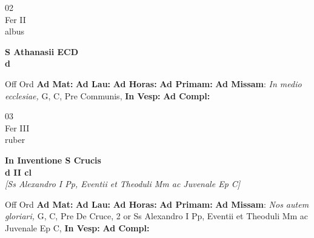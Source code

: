 \documentclass[10pt, openany]{book}
\begin{document}
    \begin{center}
        \begin{minipage}{3.5in}
            \vspace{2em}
            \begin{minipage}{0.5in}
                {\Huge 02} \\
                {\normalsize Fer II} \\
                {\normalsize albus}
            \end{minipage}
            \begin{minipage}{3.0in}
                \textbf{ \large S Athanasii ECD \\
                \textnormal{\normalsize d}} \\ 
            \end{minipage}
            \begin{justify}Off Ord
                \textbf{Ad Mat: }
                \textbf{Ad Lau: }
                \textbf{Ad Horas: }
                \textbf{Ad Primam: }\textbf{Ad Missam}: \textit{In medio ecclesiae,} G, C, Pre Communis,  
                \textbf{In Vesp: }
                \textbf{Ad Compl: }
            \end{justify}
        \end{minipage}
    \end{center}

    \begin{center}
        \begin{minipage}{3.5in}
            \vspace{2em}
            \begin{minipage}{0.5in}
                {\Huge 03} \\
                {\normalsize Fer III} \\
                {\normalsize ruber}
            \end{minipage}
            \begin{minipage}{3.0in}
                \textbf{ \large In Inventione S Crucis \\
                \textnormal{\normalsize d II cl}} \\ \textit{[Ss Alexandro I Pp, Eventii et Theoduli Mm ac Juvenale Ep C]} \\ 
            \end{minipage}
            \begin{justify}Off Ord
                \textbf{Ad Mat: }
                \textbf{Ad Lau: }
                \textbf{Ad Horas: }
                \textbf{Ad Primam: }\textbf{Ad Missam}: \textit{Nos autem gloriari,} G, C, Pre De Cruce, 2 or Ss Alexandro I Pp, Eventii et Theoduli Mm ac Juvenale Ep C,  
                \textbf{In Vesp: }
                \textbf{Ad Compl: }
            \end{justify}
        \end{minipage}
    \end{center}
\end{document}
